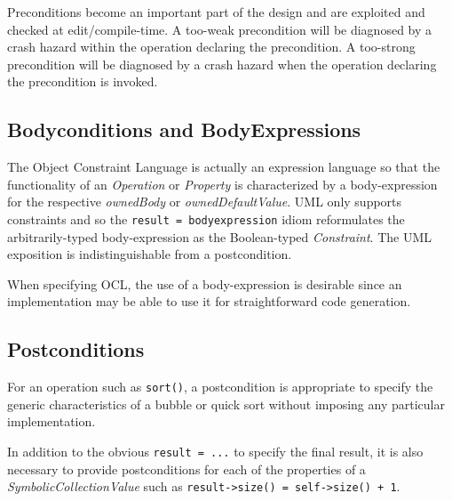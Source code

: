 \documentclass[
]{ceurart}
\begin{document}
Preconditions become an important part of the design and are exploited and checked at edit/compile-time. A too-weak precondition will be diagnosed by a crash hazard within the operation declaring the precondition. A too-strong precondition will be diagnosed by a crash hazard when the operation declaring the precondition is invoked.


\subsection{Bodyconditions and BodyExpressions}

The Object Constraint Language is actually an expression language so that the functionality of an \emph{Operation} or \emph{Property} is characterized by a body-expression for the respective \emph{ownedBody} or \emph{ownedDefaultValue}. UML only supports constraints and so the \verb|result = bodyexpression| idiom reformulates the arbitrarily-typed body-expression as the Boolean-typed \emph{Constraint}. The UML exposition is indistinguishable from a postcondition.

When specifying OCL, the use of a body-expression is desirable since an implementation may be able to use it for straightforward code generation.

\subsection{Postconditions}

For an operation such as \verb|sort()|, a postcondition is appropriate to specify the generic characteristics of a bubble or quick sort without imposing any particular implementation. 

In addition to the obvious \verb|result = ...| to specify the final result, it is also necessary to provide postconditions for each of the properties of a \emph{SymbolicCollectionValue} such as 
\verb|result->size() = self->size() + 1|.

\end{document}
